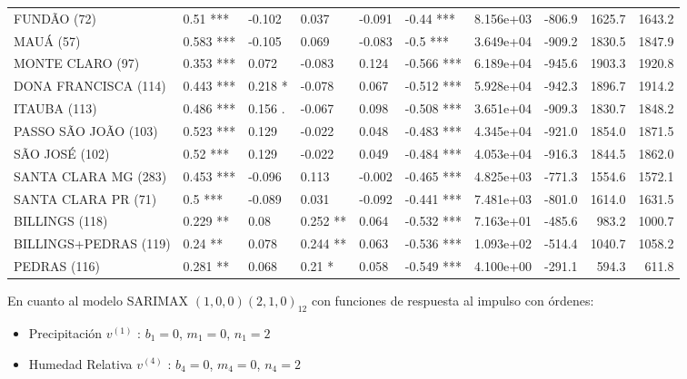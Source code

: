 \documentclass[12pt,oneside]{book}\usepackage[]{graphicx}\usepackage[]{color}
\newenvironment{knitrout}{}{} %
\theoremstyle{definition} %
\begin{document}
\begin{knitrout}
\begin{table}
{\begin{tabular}[t]{llllllrrrr}
FUNDÃO (72) & 0.51 *** & -0.102 & 0.037 & -0.091 & -0.44 *** & 8.156e+03 & -806.9 & 1625.7 & 1643.2\\
\addlinespace
\rowcolor{gray!6}  MAUÁ (57) & 0.583 *** & -0.105 & 0.069 & -0.083 & -0.5 *** & 3.649e+04 & -909.2 & 1830.5 & 1847.9\\
MONTE CLARO (97) & 0.353 *** & 0.072 & -0.083 & 0.124 & -0.566 *** & 6.189e+04 & -945.6 & 1903.3 & 1920.8\\
\rowcolor{gray!6}  DONA FRANCISCA (114) & 0.443 *** & 0.218 * & -0.078 & 0.067 & -0.512 *** & 5.928e+04 & -942.3 & 1896.7 & 1914.2\\
ITAUBA (113) & 0.486 *** & 0.156 . & -0.067 & 0.098 & -0.508 *** & 3.651e+04 & -909.3 & 1830.7 & 1848.2\\
\rowcolor{gray!6}  PASSO SÃO JOÃO (103) & 0.523 *** & 0.129 & -0.022 & 0.048 & -0.483 *** & 4.345e+04 & -921.0 & 1854.0 & 1871.5\\
\addlinespace
SÃO JOSÉ (102) & 0.52 *** & 0.129 & -0.022 & 0.049 & -0.484 *** & 4.053e+04 & -916.3 & 1844.5 & 1862.0\\
\rowcolor{gray!6}  SANTA CLARA MG (283) & 0.453 *** & -0.096 & 0.113 & -0.002 & -0.465 *** & 4.825e+03 & -771.3 & 1554.6 & 1572.1\\
SANTA CLARA PR (71) & 0.5 *** & -0.089 & 0.031 & -0.092 & -0.441 *** & 7.481e+03 & -801.0 & 1614.0 & 1631.5\\
\rowcolor{gray!6}  BILLINGS (118) & 0.229 ** & 0.08 & 0.252 ** & 0.064 & -0.532 *** & 7.163e+01 & -485.6 & 983.2 & 1000.7\\
BILLINGS+PEDRAS (119) & 0.24 ** & 0.078 & 0.244 ** & 0.063 & -0.536 *** & 1.093e+02 & -514.4 & 1040.7 & 1058.2\\
\addlinespace
\rowcolor{gray!6}  PEDRAS (116) & 0.281 ** & 0.068 & 0.21 * & 0.058 & -0.549 *** & 4.100e+00 & -291.1 & 594.3 & 611.8\\
\bottomrule
\end{tabular}}
\end{table}


\end{knitrout}



En cuanto al modelo SARIMAX $(1,0,0)(2,1,0)_{12}$ con funciones de respuesta al impulso con órdenes:

\begin{itemize}
\item Precipitación $v^{(1)}$ : $b_1= 0$, $m_1=0$, $n_1=2$
\item Humedad Relativa $v^{(4)}$ : $b_4= 0$, $m_4=0$, $n_4=2$
\end{itemize}
\end{document}
